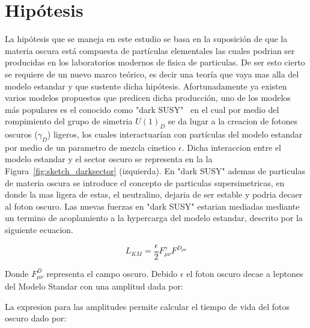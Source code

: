\chapter{Hipótesis}

La hipótesis que se maneja en este estudio se basa en la suposici\'on de que la materia oscura está compuesta de partículas elementales las cuales podrian ser producidas en los laboratorios modernos de fisica de particulas. De ser esto cierto se requiere de un nuevo marco teórico, es decir una teoría que vaya mas alla del modelo estandar y que sustente dicha hipótesis.
Afortunadamente ya existen varios modelos propuestos que predicen dicha
producción, uno de los modelos más populares es el conocido como "dark SUSY"~\cite{} en el cual por medio del rompimiento del grupo de simetria $U(1)_{D}$ se da lugar a la creacion de fotones oscuros ($\gamma_{D}$) ligeros, los cuales interactuarían con partículas del modelo estandar por medio de un parametro 
de mezcla cinetico $\epsilon$.  Dicha interaccion entre el modelo estandar y el sector oscuro se representa en la la Figura~\ref{fig:sketch_darksector} (izquierda). En "dark SUSY" ademas de particulas de materia oscura se introduce el concepto de particulas supersimetricas, en donde la mas ligera de estas, el neutralino, dejaria de ser estable y podria decaer al foton oscuro. Las nuevas fuerzas en "dark SUSY" estarian mediadas mediante un termino de acoplamiento a la hypercarga del modelo estandar, descrito por la siguiente ecuacion.  

\begin{equation} 
L_{KM} = \frac{\epsilon}{2} F_{\mu\nu}^{\gamma}F^{D_{\mu\nu}}
\end{equation}

Donde $F_{\mu\nu}^{D}$ representa el campo oscuro.  Debido $\epsilon$ el foton oscuro decae a leptones del Modelo Standar con una amplitud dada por: 


La expresion para las amplitudes permite calcular el tiempo de vida del fotos oscuro dado por: 


